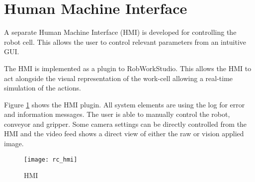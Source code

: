 \section{Human Machine Interface}
\label{sec:rc_hmi}
A separate Human Machine Interface (HMI) is developed for controlling the robot cell. This allows the user to control relevant parameters from an intuitive GUI. 

The HMI is implemented as a plugin to RobWorkStudio. This allows the HMI to act alongside the visual representation of the work-cell allowing a real-time simulation of the actions.

Figure \ref{fig:rc_hmi} shows the HMI plugin. All system elements are using the log for error and information messages. The user is able to manually control the robot, conveyor and gripper. Some camera settings can be directly controlled from the HMI and the video feed shows a direct view of either the raw or vision applied image. 

	\begin{figure}[H]
		\centering
	    \texttt{[image: rc\_hmi]}
	    \caption{HMI}
		\label{fig:rc_hmi}
	\end{figure}